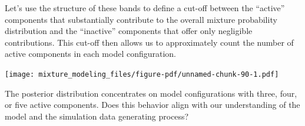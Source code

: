\documentclass[
  letterpaper,
  DIV=11,
  numbers=noendperiod]{scrartcl}
\newenvironment{Shaded}{\begin{snugshade}}{\end{snugshade}}
\newcommand{\AttributeTok}[1]{\textcolor[rgb]{0.40,0.45,0.13}{#1}}
\newcommand{\ControlFlowTok}[1]{\textcolor[rgb]{0.00,0.23,0.31}{#1}}
\newcommand{\DecValTok}[1]{\textcolor[rgb]{0.68,0.00,0.00}{#1}}
\newcommand{\FloatTok}[1]{\textcolor[rgb]{0.68,0.00,0.00}{#1}}
\newcommand{\FunctionTok}[1]{\textcolor[rgb]{0.28,0.35,0.67}{#1}}
\newcommand{\NormalTok}[1]{\textcolor[rgb]{0.00,0.23,0.31}{#1}}
\newcommand{\OtherTok}[1]{\textcolor[rgb]{0.00,0.23,0.31}{#1}}
\newcommand{\SpecialCharTok}[1]{\textcolor[rgb]{0.37,0.37,0.37}{#1}}
\newcommand{\StringTok}[1]{\textcolor[rgb]{0.13,0.47,0.30}{#1}}
\begin{document}
Let's use the structure of these bands to define a cut-off between the
``active'' components that substantially contribute to the overall
mixture probability distribution and the ``inactive'' components that
offer only negligible contributions. This cut-off then allows us to
approximately count the number of active components in each model
configuration.

\begin{Shaded}
\end{Shaded}

\texttt{[image: mixture\_modeling\_files/figure-pdf/unnamed-chunk-90-1.pdf]}

The posterior distribution concentrates on model configurations with
three, four, or five active components. Does this behavior align with
our understanding of the model and the simulation data generating
process?
\end{document}

